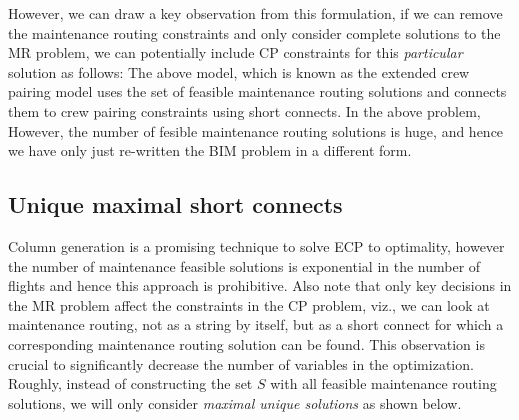 \documentclass[letterpaper, 10pt, twocolumn, reqno]{amsart}
\begin{document}
However, we can draw a key observation from this formulation, if we can remove the maintenance routing constraints and only consider complete solutions to the MR problem, we can potentially include CP constraints for this \emph{particular} solution as follows:
The above model, which is known as the extended crew pairing model uses the set of feasible maintenance routing solutions and connects them to crew pairing constraints using short connects. In the above problem,
However, the number of fesible maintenance routing solutions is huge, and hence we have only just re-written the BIM problem in a different form.

\subsection{Unique maximal short connects}
\label{ssec:unique_maximal_sc}

Column generation is a promising technique to solve ECP to optimality, however the number of maintenance feasible solutions is exponential in the number of flights and hence this approach is prohibitive. Also note that only key decisions in the MR problem affect the constraints in the CP problem, viz., we can look at maintenance routing, not as a string by itself, but as a short connect for which a corresponding maintenance routing solution can be found. This observation is crucial to significantly decrease the number of variables in the optimization. Roughly, instead of constructing the set $S$ with all feasible maintenance routing solutions, we will only consider \emph{maximal unique solutions} as shown below.
\end{document}
